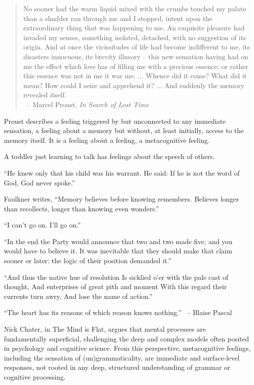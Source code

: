 \begin{quote}
    No sooner had the warm liquid mixed with the crumbs touched my palate than a shudder ran through me and I stopped, intent upon the extraordinary thing that was happening to me. An exquisite pleasure had invaded my senses, something isolated, detached, with no suggestion of its origin. And at once the vicissitudes of life had become indifferent to me, its disasters innocuous, its brevity illusory – this new sensation having had on me the effect which love has of filling me with a precious essence; or rather this essence was not in me it was me. ... Whence did it come? What did it mean? How could I seize and apprehend it? ... And suddenly the memory revealed itself. \\\hfill~-- Marcel Proust, \textit{In Search of Lost Time}
\end{quote}

Proust describes a feeling triggered by but unconnected to any immediate sensation, a feeling about a memory but without, at least initially, access to the memory itself. It is a feeling about a feeling, a metacognitive feeling.

A toddler just learning to talk has feelings about the speech of others.

``He knew only that his child was his warrant. He said: If he is not the word of God, God never spoke.''

Faulkner writes, ``Memory believes before knowing remembers. Believes longer than recollects, longer than knowing even wonders.''


``I can't go on. I'll go on.''


``In the end the Party would announce that two and two made five, and you would have to believe it. It was inevitable that they should make that claim sooner or later: the logic of their position demanded it.''

``And thus the native hue of resolution
Is sicklied o'er with the pale cast of thought,
And enterprises of great pith and moment
With this regard their currents turn awry,
And lose the name of action.''

``The heart has its reasons of which reason knows nothing.''
 ~--  Blaise Pascal


Nick Chater, in The Mind is Flat, argues that mental processes are fundamentally superficial, challenging the deep and complex models often posited in psychology and cognitive science. From this perspective, metacognitive feelings, including the sensation of (un)grammaticality, are immediate and surface-level responses, not rooted in any deep, structured understanding of grammar or cognitive processing.

